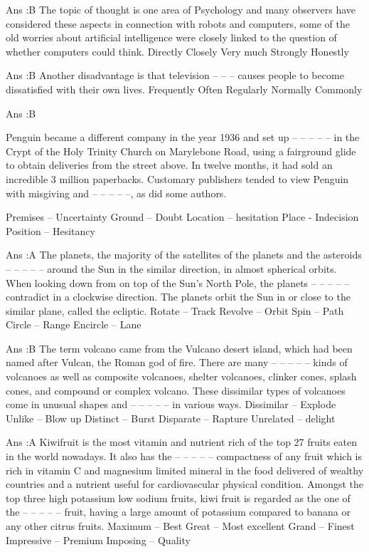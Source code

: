     Ans :B
    The topic of thought is one area of Psychology and many observers have considered these aspects in connection with robots and computers, some of the old worries about artificial intelligence were closely linked to the question of whether computers could think.
        Directly
        Closely
        Very much
        Strongly
        Honestly 

    Ans :B
    Another disadvantage is that television -- -- -- causes people to become dissatisfied with their own lives.
        Frequently
        Often
        Regularly
        Normally
        Commonly 

    Ans :B 



    Penguin became a different company in the year 1936 and set up -- -- -- -- -- in the Crypt of the Holy Trinity Church on Marylebone Road, using a fairground glide to obtain deliveries from the street above. In twelve months, it had sold an incredible 3 million paperbacks. Customary publishers tended to view Penguin with misgiving and -- -- -- -- --, as did some authors.

        Premises – Uncertainty
        Ground – Doubt
        Location – hesitation
        Place - Indecision
        Position – Hesitancy 

    Ans :A
    The planets, the majority of the satellites of the planets and the asteroids -- -- -- -- -- around the Sun in the similar direction, in almost spherical orbits. When looking down from on top of the Sun's North Pole, the planets -- -- -- -- -- contradict in a clockwise direction. The planets orbit the Sun in or close to the similar plane, called the ecliptic.
        Rotate – Track
        Revolve – Orbit
        Spin – Path
        Circle – Range
        Encircle – Lane 

    Ans :B
    The term volcano came from the Vulcano desert island, which had been named after Vulcan, the Roman god of fire. There are many -- -- -- -- -- kinds of volcanoes as well as composite volcanoes, shelter volcanoes, clinker cones, splash cones, and compound or complex volcano. These dissimilar types of volcanoes come in unusual shapes and -- -- -- -- -- in various ways.
        Dissimilar – Explode
        Unlike – Blow up
        Distinct – Burst
        Disparate – Rapture
        Unrelated – delight 

    Ans :A
    Kiwifruit is the most vitamin and nutrient rich of the top 27 fruits eaten in the world nowadays. It also has the -- -- -- -- -- compactness of any fruit which is rich in vitamin C and magnesium limited mineral in the food delivered of wealthy countries and a nutrient useful for cardiovascular physical condition. Amongst the top three high potassium low sodium fruits, kiwi fruit is regarded as the one of the -- -- -- -- -- fruit, having a large amount of potassium compared to banana or any other citrus fruits.
        Maximum – Best
        Great – Most excellent
        Grand – Finest
        Impressive – Premium
        Imposing – Quality 

